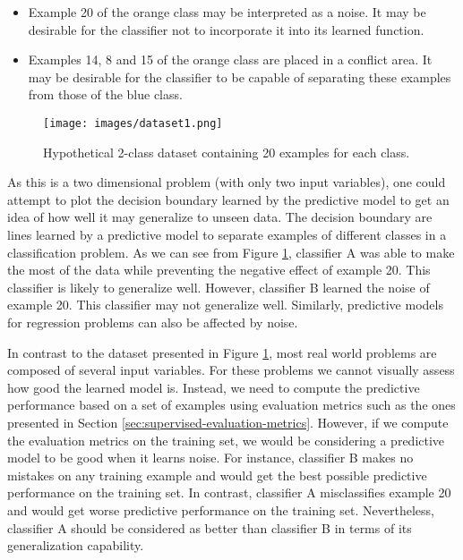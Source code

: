 \begin{itemize}
    \item Example 20 of the orange class may be interpreted as a noise. It may be desirable for the classifier not to incorporate it into its learned function.
    \item Examples 14, 8 and 15 of the orange class are placed in a conflict area. It may be desirable for the classifier to be capable of separating these examples from those of the blue class. %
\end{itemize}


\begin{figure}[h]
    \centering
    \texttt{[image: images/dataset1.png]}
    \caption{Hypothetical 2-class dataset containing 20 examples for each class.}
    \label{fig:ds1}
\end{figure}


As this is a two dimensional problem (with only two input variables), one could attempt to plot the decision boundary learned by the predictive model to get an idea of how well it may generalize to unseen data. The decision boundary are lines learned by a predictive model to separate examples of different classes in a classification problem. As we can see from Figure \ref{fig:ds1}, classifier A was able to make the most of the data while preventing the negative effect of example 20. This classifier is likely to generalize well. However, classifier B learned the noise of example 20. This classifier may not generalize well. Similarly, predictive models for regression problems can also be affected by noise.

In contrast to the dataset presented in Figure \ref{fig:ds1}, most real world problems are composed of several input variables. For these problems we cannot visually assess how good the learned model is.  Instead, we need to compute the predictive performance based on a set of examples using evaluation metrics such as the ones presented in Section \ref{sec:supervised-evaluation-metrics}. However, if we compute the evaluation metrics on the training set, we would be considering a predictive model to be good when it learns noise. For instance, classifier B makes no mistakes on any training example and would get the best possible predictive performance on the training set. In contrast, classifier A misclassifies example 20 and would get worse predictive performance on the training set. Nevertheless, classifier A should be considered as better than classifier B in terms of its generalization capability. 

